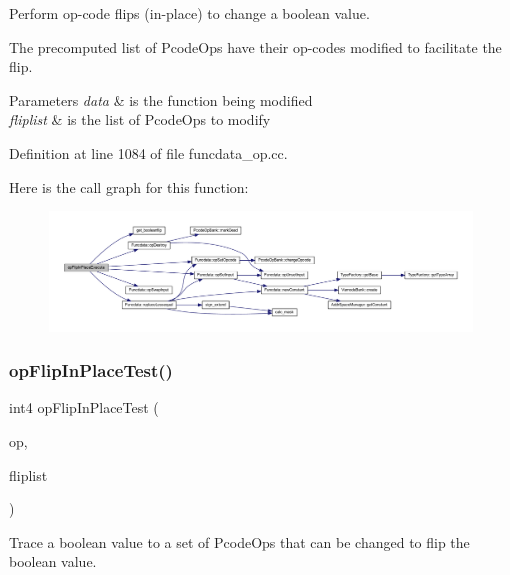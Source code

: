 Perform op-\/code flips (in-\/place) to change a boolean value. 

The precomputed list of Pcode\+Ops have their op-\/codes modified to facilitate the flip. 
\begin{DoxyParams}{Parameters}
{\em data} & is the function being modified \\
\hline
{\em fliplist} & is the list of Pcode\+Ops to modify \\
\hline
\end{DoxyParams}


Definition at line 1084 of file funcdata\+\_\+op.\+cc.

Here is the call graph for this function\+:
\nopagebreak
\begin{figure}[H]
\begin{center}
\leavevmode
\includegraphics[width=350pt]{funcdata_8hh_a0a7a4ee0c419ed55c99f44d914284828_cgraph}
\end{center}
\end{figure}
\mbox{\label{funcdata_8hh_a297da0f17b1920199962c68f91daab29}} 
\subsubsection{\texorpdfstring{opFlipInPlaceTest()}{opFlipInPlaceTest()}}
{\footnotesize\ttfamily int4 op\+Flip\+In\+Place\+Test (\begin{DoxyParamCaption}\item[{\mbox{\hyperlink{class_pcode_op}{Pcode\+Op}} $\ast$}]{op,  }\item[{vector$<$ \mbox{\hyperlink{class_pcode_op}{Pcode\+Op}} $\ast$ $>$ \&}]{fliplist }\end{DoxyParamCaption})}



Trace a boolean value to a set of Pcode\+Ops that can be changed to flip the boolean value. 


